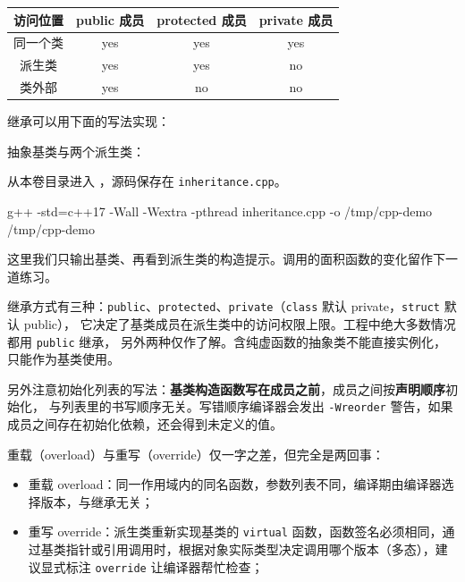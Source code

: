 \begin{center}
    \begin{tabular}{cccc}
        \toprule[1.5pt]
        访问位置 & public 成员 & protected 成员 & private 成员\\
        \midrule[1pt]
        同一个类 & yes & yes & yes \\
        派生类 & yes & yes & no \\
        类外部 & yes & no & no \\
        \bottomrule[1.5pt]
    \end{tabular}
\end{center}

继承可以用下面的写法实现：

\begin{example}
抽象基类与两个派生类：



从本卷目录进入 ，源码保存在 \texttt{inheritance.cpp}。
\begin{tbash}
g++ -std=c++17 -Wall -Wextra -pthread inheritance.cpp -o /tmp/cpp-demo
/tmp/cpp-demo
\end{tbash}
这里我们只输出基类、再看到派生类的构造提示。调用的面积函数的变化留作下一道练习。
\end{example}

\begin{note}
继承方式有三种：\texttt{public}、\texttt{protected}、\texttt{private}（\texttt{class} 默认 private，\texttt{struct} 默认 public），
它决定了基类成员在派生类中的访问权限上限。工程中绝大多数情况都用 \texttt{public} 继承，
另外两种仅作了解。含纯虚函数的抽象类不能直接实例化，只能作为基类使用。

另外注意初始化列表的写法：\textbf{基类构造函数写在成员之前}，成员之间按\textbf{声明顺序}初始化，
与列表里的书写顺序无关。写错顺序编译器会发出 \texttt{-Wreorder} 警告，如果成员之间存在初始化依赖，还会得到未定义的值。
\end{note}

\begin{conclusion}
重载（overload）与重写（override）仅一字之差，但完全是两回事：

\begin{itemize}
\item 重载 overload：同一作用域内的同名函数，参数列表不同，编译期由编译器选择版本，与继承无关；
\item 重写 override：派生类重新实现基类的 \texttt{virtual} 函数，函数签名必须相同，通过基类指针或引用调用时，根据对象实际类型决定调用哪个版本（多态），建议显式标注 \texttt{override} 让编译器帮忙检查；
\end{itemize}
\end{conclusion}

